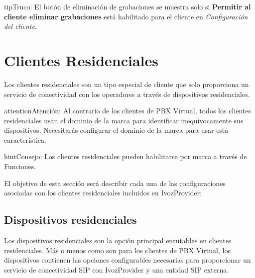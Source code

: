 \documentclass[letterpaper,10pt,spanish]{sphinxmanual}
\begin{document}
\begin{notice}{tip}{Truco:}
El botón de eliminación de grabaciones se muestra solo si \textbf{Permitir al cliente eliminar grabaciones} está habilitado para el cliente en \emph{Configuración del cliente}.
\end{notice}
\label{administration_portal/client/residential/index:residential-clients}

\section{Clientes Residenciales}
\label{administration_portal/client/residential/index:residential-clients}\label{administration_portal/client/residential/index:id1}\label{administration_portal/client/residential/index::doc}\label{administration_portal/client/residential/index:clientes-residenciales}
Los clientes residenciales son un tipo especial de cliente que solo proporciona un servicio de conectividad con los operadores a través de dispositivos residenciales.

\begin{notice}{attention}{Atención:}
Al contrario de los clientes de PBX Virtual, todos los clientes residenciales usan el dominio de la marca para identificar inequívocamente sus dispositivos. Necesitarás configurar el dominio de la marca para usar esta característica.
\end{notice}

\begin{notice}{hint}{Consejo:}
Los clientes residenciales pueden habilitarse por marca a través de Funciones.
\end{notice}

El objetivo de esta sección será describir cada una de las configuraciones asociadas con los clientes residenciales incluidos en IvozProvider:


\subsection{Dispositivos residenciales}
\label{administration_portal/client/residential/residential_devices:id1}\label{administration_portal/client/residential/residential_devices::doc}\label{administration_portal/client/residential/residential_devices:residential-devices}
Los dispositivos residenciales son la opción principal enrutables en clientes residenciales. Más o menos como {\hyperref[administration_portal/client/vpbx/routing_endpoints/friends/index:friends]{}} son para los clientes de PBX Virtual, los dispositivos contienen las opciones configurables necesarias para proporcionar un servicio de conectividad SIP con IvozProvider y una entidad SIP externa.
\end{document}

